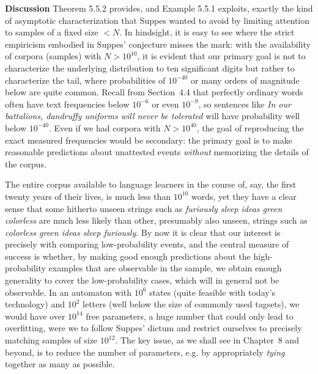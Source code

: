 \smallskip
\noindent 
{\bf Discussion} Theorem 5.5.2 provides, and Example 5.5.1 exploits, exactly
the kind of asymptotic characterization that Suppes wanted to avoid by
limiting attention to samples of a fixed size $<N$.  In hindsight, it is easy
to see where the strict empiricism embodied in Suppes' conjecture misses the
mark: with the availability of corpora (samples) with $N > 10^{10}$, it is
evident that our primary goal is not to characterize the underlying
distribution to ten significant digits but rather to characterize the tail,
where probabilities of $10^{-40}$ or many orders of magnitude below are quite
common. Recall from Section~4.4 that perfectly ordinary words often have text
frequencies below $10^{-6}$ or even $10^{-9}$, so sentences like {\it In our
  battalions, dandruffy uniforms will never be tolerated} will have
probability well below $10^{-40}$.  Even if we had corpora with $N > 10^{40}$,
the goal of reproducing the exact measured frequencies would be secondary: the
primary goal is to make reasonable predictions about unattested events {\it
  without} memorizing the details of the corpus.

The entire corpus available to language learners in the course of, say, the
first twenty years of their lives, is much less than $10^{10}$ words, yet they
have a clear sense that some hitherto unseen strings such as {\it furiously
sleep ideas green colorless} are much less likely than other, presumably also
unseen, strings such as {\it colorless green ideas sleep furiously}. By now it
is clear that our interest is precisely with comparing low-probability events,
and the central measure of success is whether, by making good enough
predictions about the high-probability examples that are observable in the
sample, we obtain enough generality to cover the low-probability cases, which
will in general not be observable. In an automaton with $10^6$ states (quite
feasible with today's technology) and $10^2$ letters (well below the size of
commonly used tagsets), we would have over $10^{14}$ free parameters, a huge
number that could only lead to overfitting, were we to follow Suppes' dictum
and restrict ourselves to precisely matching samples of size $10^{12}$. The
key issue, as we shall see in Chapter~8 and beyond, is to reduce the number of
parameters, e.g. by appropriately {\it tying} together as many as possible. 

